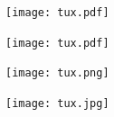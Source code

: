 \texttt{[image: tux.pdf]}~

\texttt{[image: tux.pdf]}~

\texttt{[image: tux.png]}~

\texttt{[image: tux.jpg]}~
